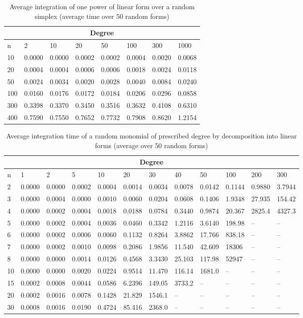 \documentclass{article}[12 pt]
\begin{document}
\begin{table}
\caption{Average integration of one power of linear form over a random simplex (average time over 50 random forms)}
\begin{tabular}{|llllllll|}
\hline
\multicolumn{8}{|c|}{Degree}  \\ \hline
n & 2 & 10 & 20 & 50 & 100 & 300 & 1000 \\ \hline
10 & 0.0000 & 0.0000 & 0.0002 & 0.0002 & 0.0004 & 0.0020 & 0.0068 \\
20 & 0.0004 & 0.0004 & 0.0006 & 0.0006 & 0.0018 & 0.0024 & 0.0118 \\
50 & 0.0024 & 0.0034 & 0.0020 & 0.0028 & 0.0040 & 0.0084 & 0.0240 \\
100 & 0.0160 & 0.0176 & 0.0172 & 0.0184 & 0.0206 & 0.0296 & 0.0858 \\
300 & 0.3398 & 0.3370 & 0.3450 & 0.3516 & 0.3632 & 0.4108 & 0.6310 \\
400 & 0.7590 & 0.7550 & 0.7652 & 0.7732 & 0.7908 & 0.8620 & 1.2154 \\ \hline
\end{tabular}
\end{table}


\begin{table}
\caption{Average integration time of a random monomial of prescribed degree by decomposition into linear forms (average over 50 random forms)}
\begin{tabular}{|llllllllllll|}
\hline
\multicolumn{12}{|c|}{Degree} \\ \hline
n & 1 & 2 & 5 & 10 & 20 & 30 & 40 & 50 & 100 & 200 & 300 \\ \hline
2 & 0.0000 & 0.0000 & 0.0002 & 0.0004 & 0.0014 & 0.0034 & 0.0078 & 0.0142 & 0.1144 & 0.9880 & 3.7944 \\
3 & 0.0000 & 0.0004 & 0.0000 & 0.0010 & 0.0060 & 0.0204 & 0.0608 & 0.1406 & 1.9348 & 27.935 & 154.42 \\
4 & 0.0000 & 0.0002 & 0.0004 & 0.0018 & 0.0188 & 0.0784 & 0.3440 & 0.9874 & 20.367 & 2825.4 & 4327.3 \\
5 & 0.0000 & 0.0002 & 0.0004 & 0.0036 & 0.0460 & 0.3342 & 1.2116 & 3.6140 & 198.98 & -- & -- \\
6 & 0.0000 & 0.0002 & 0.0006 & 0.0060 & 0.1132 & 0.8264 & 3.8862 & 17.766 & 838.18 & -- & -- \\
7 & 0.0000 & 0.0002 & 0.0010 & 0.0098 & 0.2086 & 1.9856 & 11.540 & 42.609 & 18306 & -- & -- \\
8 & 0.0000 & 0.0000 & 0.0014 & 0.0126 & 0.4568 & 3.3430 & 25.103 & 117.98 & 52947 & -- & -- \\
10 & 0.0000 & 0.0000 & 0.0020 & 0.0224 & 0.9514 & 11.470 & 116.14 & 1681.0 & -- & -- & -- \\
15 & 0.0002 & 0.0008 & 0.0044 & 0.0586 & 6.2396 & 149.05 & 3733.2 & -- & -- & -- & -- \\
20 & 0.0002 & 0.0016 & 0.0078 & 0.1428 & 21.829 & 1546.1 & -- & -- & -- & -- & -- \\
30 & 0.0008 & 0.0016 & 0.0190 & 0.4724 & 85.416 & 2368.0 & -- & -- & -- & -- & -- \\ \hline
\end{tabular}
\end{table}
\end{document}
